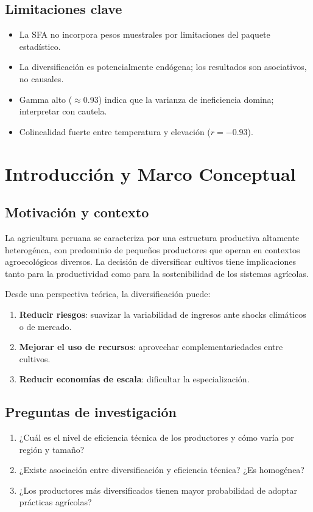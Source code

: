\documentclass[11pt,a4paper]{article}
\begin{document}
\subsection{Limitaciones clave}
\begin{itemize}[leftmargin=*]
    \item La SFA no incorpora pesos muestrales por limitaciones del paquete estadístico.
    \item La diversificación es potencialmente endógena; los resultados son asociativos, no causales.
    \item Gamma alto ($\approx$0.93) indica que la varianza de ineficiencia domina; interpretar con cautela.
    \item Colinealidad fuerte entre temperatura y elevación ($r = -0.93$).
\end{itemize}

\newpage
\section{Introducción y Marco Conceptual}

\subsection{Motivación y contexto}
La agricultura peruana se caracteriza por una estructura productiva altamente heterogénea, con predominio de pequeños productores que operan en contextos agroecológicos diversos. La decisión de diversificar cultivos tiene implicaciones tanto para la productividad como para la sostenibilidad de los sistemas agrícolas.

Desde una perspectiva teórica, la diversificación puede:
\begin{enumerate}
    \item \textbf{Reducir riesgos}: suavizar la variabilidad de ingresos ante shocks climáticos o de mercado.
    \item \textbf{Mejorar el uso de recursos}: aprovechar complementariedades entre cultivos.
    \item \textbf{Reducir economías de escala}: dificultar la especialización.
\end{enumerate}

\subsection{Preguntas de investigación}
\begin{enumerate}
    \item[\textbf{P1.}] ¿Cuál es el nivel de eficiencia técnica de los productores y cómo varía por región y tamaño?
    \item[\textbf{P2.}] ¿Existe asociación entre diversificación y eficiencia técnica? ¿Es homogénea?
    \item[\textbf{P3.}] ¿Los productores más diversificados tienen mayor probabilidad de adoptar prácticas agrícolas?
\end{enumerate}
\end{document}
